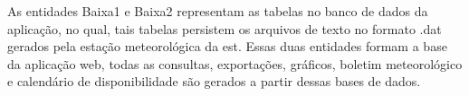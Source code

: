As entidades Baixa1 e Baixa2 representam as tabelas no banco de dados da aplicação, no qual, tais tabelas persistem os arquivos de texto no formato .dat gerados pela estação meteorológica da est. Essas duas entidades formam a base da aplicação web,  todas as consultas, exportações, gráficos, boletim meteorológico e calendário de disponibilidade são gerados a partir dessas bases de dados.